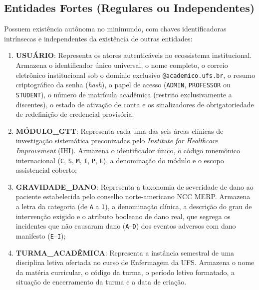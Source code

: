 \subsection{Entidades Fortes (Regulares ou Independentes)}
Possuem existência autônoma no minimundo, com chaves identificadoras intrínsecas e independentes da existência de outras entidades:
\begin{enumerate}
    \item \textbf{USUÁRIO}: Representa os atores autenticáveis no ecossistema institucional. Armazena o identificador único universal, o nome completo, o correio eletrônico institucional sob o domínio exclusivo \texttt{@academico.ufs.br}, o resumo criptográfico da senha (\textit{hash}), o papel de acesso (\texttt{ADMIN}, \texttt{PROFESSOR} ou \texttt{STUDENT}), o número de matrícula acadêmica (restrito exclusivamente a discentes), o estado de ativação de conta e os sinalizadores de obrigatoriedade de redefinição de credencial provisória;
    \item \textbf{MÓDULO\_GTT}: Representa cada uma das seis áreas clínicas de investigação sistemática preconizadas pelo \textit{Institute for Healthcare Improvement} (IHI). Armazena o identificador único, o código mnemônico internacional (\texttt{C}, \texttt{S}, \texttt{M}, \texttt{I}, \texttt{P}, \texttt{E}), a denominação do módulo e o escopo assistencial coberto;
    \item \textbf{GRAVIDADE\_DANO}: Representa a taxonomia de severidade de dano ao paciente estabelecida pelo conselho norte-americano NCC MERP. Armazena a letra da categoria (de \texttt{A} a \texttt{I}), a denominação clínica, a descrição do grau de intervenção exigido e o atributo booleano de dano real, que segrega os incidentes que não causaram dano (\texttt{A}--\texttt{D}) dos eventos adversos com dano manifesto (\texttt{E}--\texttt{I});
    \item \textbf{TURMA\_ACADÊMICA}: Representa a instância semestral de uma disciplina letiva ofertada no curso de Enfermagem da UFS. Armazena o nome da matéria curricular, o código da turma, o período letivo formatado, a situação de encerramento da turma e a data de criação.
\end{enumerate}

